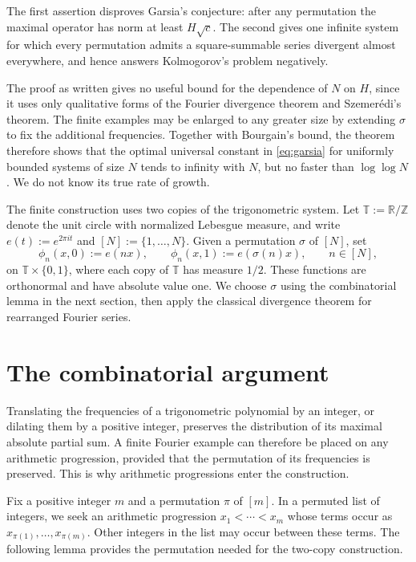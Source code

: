 \documentclass[11pt]{article}
\theoremstyle{remark}
\numberwithin{equation}{section}
\newcommand{\T}{\mathbb T}
\newcommand{\Z}{\mathbb Z}
\newcommand{\R}{\mathbb R}
\begin{document}
The first assertion disproves Garsia's conjecture: after any permutation the maximal operator has norm at least $H\sqrt c$. The second gives one infinite system for which every permutation admits a square-summable series divergent almost everywhere, and hence answers Kolmogorov's problem negatively.

The proof as written gives no useful bound for the dependence of $N$ on $H$, since it uses only qualitative forms of the Fourier divergence theorem and Szemer\'edi's theorem. The finite examples may be enlarged to any greater size by extending $\sigma$ to fix the additional frequencies. Together with Bourgain's bound, the theorem therefore shows that the optimal universal constant in \eqref{eq:garsia} for uniformly bounded systems of size $N$ tends to infinity with $N$, but no faster than $\log\log N$. We do not know its true rate of growth.

The finite construction uses two copies of the trigonometric system. Let $\T:=\R/\Z$ denote the unit circle with normalized Lebesgue measure, and write $e(t):=e^{2\pi it}$ and $[N]:=\{1,\ldots,N\}$. Given a permutation $\sigma$ of $[N]$, set
\begin{equation}\label{eq:construction}
 \phi_n(x,0):=e(nx),\qquad
 \phi_n(x,1):=e(\sigma(n)x),\qquad n\in[N],
\end{equation}
on $\T\times\{0,1\}$, where each copy of $\T$ has measure $1/2$. These functions are orthonormal and have absolute value one. We choose $\sigma$ using the combinatorial lemma in the next section, then apply the classical divergence theorem for rearranged Fourier series.

\section{The combinatorial argument}

Translating the frequencies of a trigonometric polynomial by an integer, or dilating them by a positive integer, preserves the distribution of its maximal absolute partial sum. A finite Fourier example can therefore be placed on any arithmetic progression, provided that the permutation of its frequencies is preserved. This is why arithmetic progressions enter the construction.

Fix a positive integer $m$ and a permutation $\pi$ of $[m]$. In a permuted list of integers, we seek an arithmetic progression $x_1<\cdots<x_m$ whose terms occur as $x_{\pi(1)},\ldots,x_{\pi(m)}$. Other integers in the list may occur between these terms. The following lemma provides the permutation needed for the two-copy construction.
\end{document}
